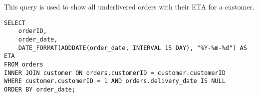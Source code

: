 This query is used to show all underlivered orders with their ETA for a customer.

\begin{lstlisting}
SELECT
    orderID,
    order_date,
    DATE_FORMAT(ADDDATE(order_date, INTERVAL 15 DAY), "%Y-%m-%d") AS ETA
FROM orders
INNER JOIN customer ON orders.customerID = customer.customerID
WHERE customer.customerID = 1 AND orders.delivery_date IS NULL
ORDER BY order_date;
\end{lstlisting}